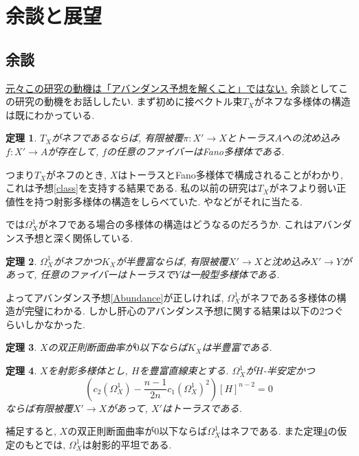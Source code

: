 \documentclass[12pt]{amsart}
\newtheorem{thm}{定理}[section]
\theoremstyle{definition}
\theoremstyle{remark}
\begin{document}
\section{余談と展望}
\subsection{余談}
\underline{元々この研究の動機は「アバンダンス予想を解くこと」ではない.}
余談としてこの研究の動機をお話ししたい. 
まず初めに接ベクトル束$T_X$がネフな多様体の構造は既にわかっている. 
\begin{thm}\cite{CP}\cite{DPS}
\label{DPSthm}
$T_X$がネフであるならば, 有限被覆$\pi : X' \rightarrow X$とトーラス$A$への沈め込み$f : X' \rightarrow A$が存在して, $f$の任意のファイバーはFano多様体である. 
\end{thm}
つまり$T_X$がネフのとき, $X$はトーラスとFano多様体で構成されることがわかり, これは予想\ref{class}を支持する結果である. 私の以前の研究は$T_X$がネフより弱い正値性を持つ射影多様体の構造をしらべていた. \cite{HIM}や\cite{Iwa20}などがそれに当たる. %

では$\Omega_{X}^{1}$がネフである場合の多様体の構造はどうなるのだろうか. これはアバンダンス予想と深く関係している.
\begin{thm}\cite{Hor13}
$\Omega_{X}^{1}$がネフかつ$K_X$が半豊富ならば, 有限被覆$X' \rightarrow X$と沈め込み$X' \rightarrow Y$があって, 任意のファイバーはトーラスで$Y$は一般型多様体である.
\end{thm}
よってアバンダンス予想\ref{Abundance}が正しければ, $\Omega_{X}^{1}$がネフである多様体の構造が完璧にわかる. しかし肝心のアバンダンス予想に関する結果は以下の2つぐらいしかなかった.
\begin{thm}\cite{WZ02}\cite{Liu13}
\label{Wu_Zheng}
$X$の双正則断面曲率が$0$以下ならば$K_X$は半豊富である.
\end{thm}
\begin{thm}\cite{JR13}\cite{GKP20b}
\label{GKP20b_thm}
$X$を射影多様体とし, $H$を豊富直線束とする. 
$\Omega_{X}^{1}$が$H$-半安定かつ
$$
\left(c_2(\Omega_{X}^{1}) - \frac{n-1}{2n}c_1(\Omega_{X}^{1})^2 \right)[H]^{n-2}=0
$$
ならば有限被覆$ X' \rightarrow X$があって, $X'$はトーラスである.
\end{thm}
補足すると, $X$の双正則断面曲率が$0$以下ならば$\Omega_{X}^{1}$はネフである. また定理\ref{GKP20b_thm}の仮定のもとでは, $\Omega_{X}^{1}$は射影的平坦である.
\end{document}
